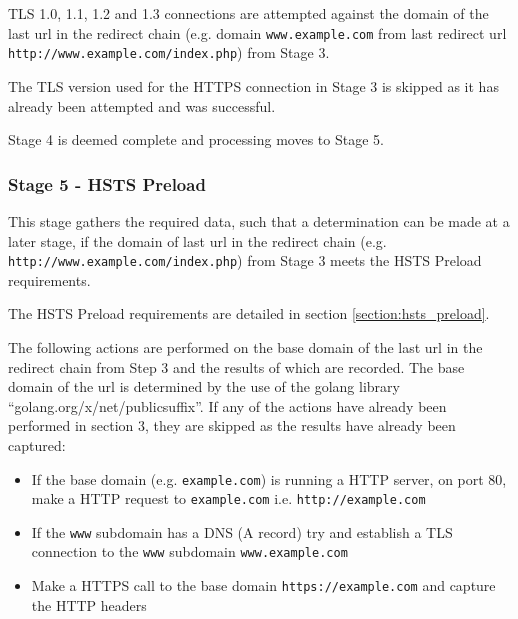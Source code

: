 \documentclass{mscreport}
\begin{document}
TLS 1.0, 1.1, 1.2 and 1.3 connections are attempted against the domain of the last url in the redirect chain (e.g. domain \texttt{www.example.com} from last redirect url \newline \texttt{http://www.example.com/index.php}) from Stage 3.

\vspace{0.3cm} \noindent
The TLS version used for the HTTPS connection in Stage 3 is skipped as it has already been attempted and was successful.


\vspace{0.3cm} \noindent
Stage 4 is deemed complete and processing moves to Stage 5.

\subsubsection{Stage 5 - HSTS Preload}
\label{subsection:stage_5_hsts}

This stage gathers the required data, such that a determination can be made at a later stage, if the domain of last url in the redirect chain (e.g. \texttt{http://www.example.com/index.php}) from Stage 3 meets the HSTS Preload requirements.

\vspace{0.3cm} \noindent
The HSTS Preload requirements are detailed in section \ref{section:hsts_preload}.

\vspace{0.3cm} \noindent
The following actions are performed on the base domain of the last url in the redirect chain from Step 3 and the results of which are recorded. The base domain of the url is determined by the use of the golang library ``golang.org/x/net/publicsuffix''. If any of the actions have already been performed in section 3, they are skipped as the results have already been captured:

\begin{itemize}
	\setlength\itemsep{0.1em}
    \item If the base domain (e.g. \texttt{example.com}) is running a HTTP server, on port 80, make a HTTP request to \texttt{example.com} i.e. \texttt{http://example.com}
    \item If the \texttt{www} subdomain has a DNS (A record) try and establish a TLS connection to the \texttt{www} subdomain \texttt{www.example.com}
    \item Make a HTTPS call to the base domain \texttt{https://example.com} and capture the HTTP headers
\end{itemize}
\end{document}
